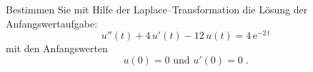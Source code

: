 {
Bestimmen Sie mit Hilfe der Laplace--Transformation die Lösung der Anfangswertaufgabe: 
$$ u''(t)+4\,u'(t)-12\,u(t)=4\,\text{e}^{-2\,t}$$
mit den Anfangswerten 
$$u(0)=0 \text{ und }  u'(0)=0\;.$$

}
% 

